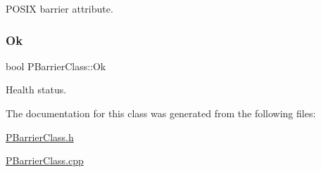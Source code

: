 P\+O\+S\+IX barrier attribute. 

\mbox{\label{classPBarrierClass_a7413466ef1598d299dcc7bdc023e0414}} 
\subsubsection{\texorpdfstring{Ok}{Ok}}
{\footnotesize\ttfamily bool P\+Barrier\+Class\+::\+Ok\hspace{0.3cm}{\ttfamily [protected]}}



Health status. 



The documentation for this class was generated from the following files\+:\begin{DoxyCompactItemize}
\item 
\hyperlink{PBarrierClass_8h}{P\+Barrier\+Class.\+h}\item 
\hyperlink{PBarrierClass_8cpp}{P\+Barrier\+Class.\+cpp}\end{DoxyCompactItemize}
